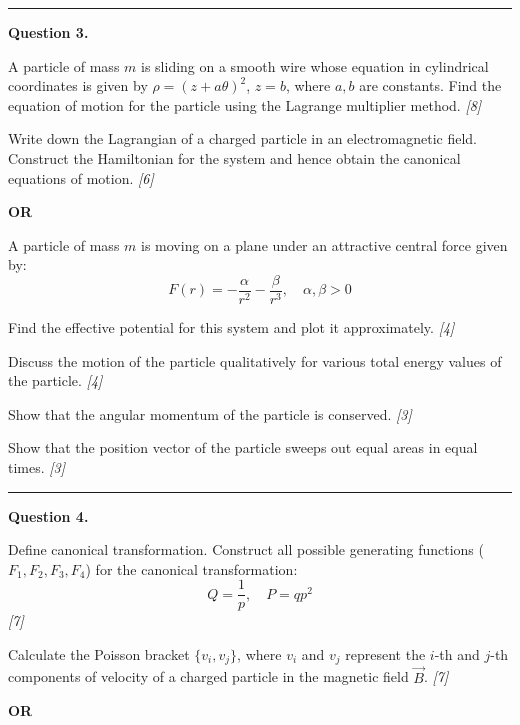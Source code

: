 \documentclass[11pt,a4paper]{article}
\newcommand{\pts}[1]{\hfill   \textit{[#1]}}
\begin{document}
\medskip\rule{\linewidth}{0.2pt}




\noindent   \textbf{Question 3.}

\begin{parts}
  \item A particle of mass $m$ is sliding on a smooth wire whose equation in cylindrical coordinates is given by $\rho = (z + a \theta)^2$, $z = b$, where $a, b$ are constants. Find the equation of motion for the particle using the Lagrange multiplier method. \pts{8}
  \item Write down the Lagrangian of a charged particle in an electromagnetic field. Construct the Hamiltonian for the system and hence obtain the canonical equations of motion. \pts{6}
\end{parts}
\hfill   \textbf{OR}

\begin{parts}
  \item A particle of mass $m$ is moving on a plane under an attractive central force given by:
    \[ F(r) = -\frac{\alpha}{r^2} - \frac{\beta}{r^3}, \quad \alpha,\beta > 0 \]
    
\begin{parts}
      \item Find the effective potential for this system and plot it approximately. \pts{4}
      \item Discuss the motion of the particle qualitatively for various total energy values of the particle. \pts{4}
      \item Show that the angular momentum of the particle is conserved. \pts{3}
      \item Show that the position vector of the particle sweeps out equal areas in equal times. \pts{3}
    \end{parts}
\end{parts}

\medskip\rule{\linewidth}{0.2pt}




\noindent   \textbf{Question 4.}

\begin{parts}
  \item Define canonical transformation. Construct all possible generating functions ($F_1, F_2, F_3, F_4$) for the canonical transformation:
    \[ Q = \frac{1}{p}, \quad P = q p^2 \] \pts{7}
  \item Calculate the Poisson bracket $\{v_i, v_j\}$, where $v_i$ and $v_j$ represent the $i$-th and $j$-th components of velocity of a charged particle in the magnetic field $\vec{B}$. \pts{7}
\end{parts}
\hfill   \textbf{OR}
\end{document}
